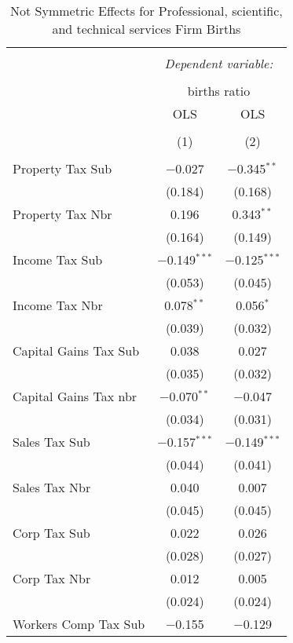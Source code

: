 
\begin{table}[!htbp] \centering 
  \caption{Not Symmetric Effects for  Professional, scientific, and technical services Firm Births} 
  \label{54noequality} 
\begin{tabular}{@{\extracolsep{5pt}}lcc} 
\\[-1.8ex]\hline 
\hline \\[-1.8ex] 
 & \multicolumn{2}{c}{\textit{Dependent variable:}} \\ 
\cline{2-3} 
\\[-1.8ex] & \multicolumn{2}{c}{births ratio} \\ 
 & OLS & OLS \\ 
\\[-1.8ex] & (1) & (2)\\ 
\hline \\[-1.8ex] 
 Property Tax Sub & $-$0.027 & $-$0.345$^{**}$ \\ 
  & (0.184) & (0.168) \\ 
  Property Tax Nbr & 0.196 & 0.343$^{**}$ \\ 
  & (0.164) & (0.149) \\ 
  Income Tax Sub & $-$0.149$^{***}$ & $-$0.125$^{***}$ \\ 
  & (0.053) & (0.045) \\ 
  Income Tax Nbr & 0.078$^{**}$ & 0.056$^{*}$ \\ 
  & (0.039) & (0.032) \\ 
  Capital Gains Tax Sub & 0.038 & 0.027 \\ 
  & (0.035) & (0.032) \\ 
  Capital Gains Tax nbr & $-$0.070$^{**}$ & $-$0.047 \\ 
  & (0.034) & (0.031) \\ 
  Sales Tax Sub & $-$0.157$^{***}$ & $-$0.149$^{***}$ \\ 
  & (0.044) & (0.041) \\ 
  Sales Tax Nbr & 0.040 & 0.007 \\ 
  & (0.045) & (0.045) \\ 
  Corp Tax Sub & 0.022 & 0.026 \\ 
  & (0.028) & (0.027) \\ 
  Corp Tax Nbr & 0.012 & 0.005 \\ 
  & (0.024) & (0.024) \\ 
  Workers Comp Tax Sub & $-$0.155 & $-$0.129 \\ 

\end{tabular}
\end{table}
